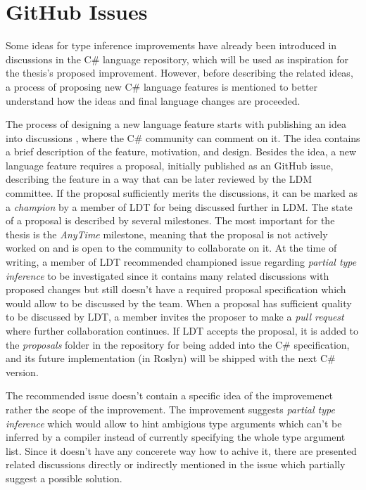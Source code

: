 \section{GitHub Issues} \label{sect04:github}

Some ideas for type inference improvements have already been introduced in discussions in the C\# language repository, which will be used as inspiration for the thesis’s proposed improvement.
However, before describing the related ideas, a process of proposing new C\# language features is mentioned to better understand how the ideas and final language changes are proceeded.
\par
The process of designing a new language feature starts with publishing an idea into discussions \cite{online:discussions}, where the C\# community can comment on it. 
The idea contains a brief description of the feature, motivation, and design. 
Besides the idea, a new language feature requires a proposal, initially published as an GitHub issue, describing the feature in a way that can be later reviewed by the \ac{LDM} committee.
If the proposal sufficiently merits the discussions, it can be marked as a \textit{champion} by a member of \ac{LDT} for being discussed further in \ac{LDM}. 
The state of a proposal is described by several milestones. 
The most important for the thesis is the \textit{AnyTime} milestone, meaning that the proposal is not actively worked on and is open to the community to collaborate on it. 
At the time of writing, a member of \ac{LDT} recommended championed issue \cite{online:champion} regarding \textit{partial type inference} to be investigated since it contains many related discussions with proposed changes but still doesn’t have a required proposal specification which would allow to be discussed by the team. 
When a proposal has sufficient quality to be discussed by \ac{LDT}, a member invites the proposer to make a \textit{pull request} where further collaboration continues. 
If \ac{LDT} accepts the proposal, it is added to the \textit{proposals} folder in the repository for being added into the C\# specification, and its future implementation (in Roslyn) will be shipped with the next C\# version. 
\par
The recommended issue doesn't contain a specific idea of the improvemenet rather the scope of the improvement.
The improvement suggests \textit{partial type inference} which would allow to hint ambigious type arguments which can't be inferred by a compiler instead of currently specifying the whole type argument list.
Since it doesn't have any concerete way how to achive it, there are presented related discussions directly or indirectly mentioned in the issue which partially suggest a possible solution.

